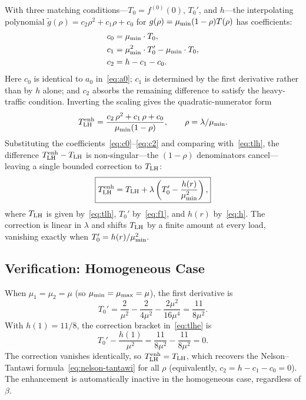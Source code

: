 With three matching conditions---$T_0 = f^{(0)}(0)$, $T_0'$, and $h$---the
interpolating polynomial $\tilde{g}(\rho) = c_2\rho^2 + c_1\rho + c_0$
for $g(\rho) = \mu_{\min}(1-\rho)T(\rho)$ has coefficients:
\begin{align}
  c_0 &= \mu_{\min} \cdot T_0, \label{eq:c0} \\
  c_1 &= \mu_{\min}^2 \cdot T_0' - \mu_{\min} \cdot T_0, \label{eq:c1} \\
  c_2 &= h - c_1 - c_0. \label{eq:c2}
\end{align}
Here $c_0$ is identical to $a_0$ in~\eqref{eq:a0}; $c_1$ is determined by
the first derivative rather than by $h$ alone; and $c_2$ absorbs the
remaining difference to satisfy the heavy-traffic condition.
Inverting the scaling gives the quadratic-numerator form
\begin{equation*}
  T_{\text{LH}}^{\text{enh}} = \frac{c_2\,\rho^2 + c_1\,\rho + c_0}{\mu_{\min}(1-\rho)},
  \qquad \rho = \lambda/\mu_{\min}.
\end{equation*}
Substituting the coefficients~\eqref{eq:c0}--\eqref{eq:c2} and comparing
with~\eqref{eq:tlh}, the difference $T_{\text{LH}}^{\text{enh}} - T_{\text{LH}}$ is non-singular---the
$(1-\rho)$ denominators cancel---leaving a single bounded correction to
$T_{\text{LH}}$:
\begin{equation}
  \label{eq:tlhe}
  \boxed{T_{\text{LH}}^{\text{enh}} = T_{\text{LH}} + \lambda\left(T_0' - \frac{h(r)}{\mu_{\min}^2}\right),}
\end{equation}
where $T_{\text{LH}}$ is given by~\eqref{eq:tlh}, $T_0'$ by~\eqref{eq:f1}, and $h(r)$
by~\eqref{eq:h}.
The correction is linear in $\lambda$ and shifts $T_{\text{LH}}$ by a finite amount at
every load, vanishing exactly when $T_0' = h(r)/\mu_{\min}^2$.

\subsection{Verification: Homogeneous Case}

When $\mu_1 = \mu_2 = \mu$ (so $\mu_{\min} = \mu_{\max} = \mu$), the first derivative is
\begin{equation}
  T_0' = \frac{2}{\mu^2} - \frac{2}{4\mu^2} - \frac{2\mu^2}{16\mu^4}
       = \frac{11}{8\mu^2}.
\end{equation}
With $h(1) = 11/8$, the correction bracket in~\eqref{eq:tlhe} is
\begin{equation}
  T_0' - \frac{h(1)}{\mu^2} = \frac{11}{8\mu^2} - \frac{11}{8\mu^2} = 0.
\end{equation}
The correction vanishes identically, so $T_{\text{LH}}^{\text{enh}} = T_{\text{LH}}$, which recovers the
Nelson--Tantawi formula~\eqref{eq:nelson-tantawi} for all $\rho$
(equivalently, $c_2 = h - c_1 - c_0 = 0$).
The enhancement is automatically inactive in the homogeneous case,
regardless of $\beta$.


